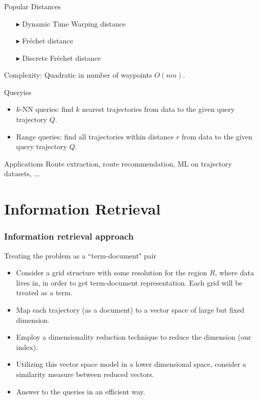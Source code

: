 \documentclass{beamer}
\begin{document}
\begin{frame}
\frametitle{}
\begin{block}{Popular Distances}
\begin{itemize}
\item [$\blacktriangleright$] Dynamic Time Warping distance 

\item [$\blacktriangleright$] Fr\'echet distance 

\item [$\blacktriangleright$] Discrete Fr\'echet distance \pause 
\end{itemize}
Complexity: {\color{orange} Quadratic in number of waypoints $O(mn)$}.
\end{block} \pause

\begin{block}{Queryies}
\begin{itemize}
\item {\color{blue} $k$-NN queries:} find $k$ nearest trajectories from data to the given query trajectory $Q$.
\item {\color{blue} Range queries:} find all trajectories within distance $r$ from data to the given query trajectory $Q$.
\end{itemize}
\end{block} \pause

\begin{block}{Applications}
{\small Route extraction, route recommendation, ML on trajectory datasets, ...}
\end{block}
\end{frame}


\section{Information Retrieval}

\begin{frame}
\frametitle{Information retrieval approach} \pause
\begin{block}{Treating the problem as a ``term-document" pair}
\begin{itemize} \pause
\item Consider a grid structure with some resolution for the region {\color{blue} $R$}, where data lives in, in order to get term-document representation. Each grid will be treated as a term. \pause
\item Map each trajectory (as a document) to a vector space of large but fixed dimension. \pause
\item Employ a dimensionality reduction technique to reduce the dimension (our {\color{blue} index}). \pause
\item Utilizing this vector space model in a lower dimensional space, consider a similarity measure between reduced vectors. \pause
\item Answer to the queries in an efficient way.
\end{itemize}
\end{block}
\end{frame}
\end{document}
